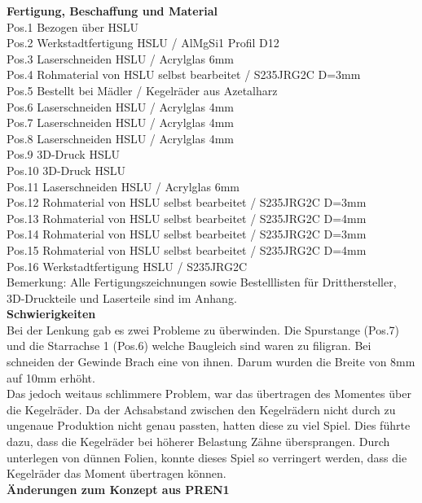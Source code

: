 \newpage
\textbf{Fertigung, Beschaffung und Material}\\[0.2cm]
Pos.1 	Bezogen über HSLU\\
Pos.2 	Werkstadtfertigung HSLU / AlMgSi1 Profil D12\\
Pos.3 	Laserschneiden HSLU / Acrylglas 6mm\\
Pos.4 	Rohmaterial von HSLU selbst bearbeitet / S235JRG2C D=3mm\\
Pos.5 	Bestellt bei Mädler / Kegelräder aus Azetalharz\\
Pos.6 	Laserschneiden HSLU / Acrylglas 4mm\\
Pos.7 	Laserschneiden HSLU / Acrylglas 4mm\\
Pos.8	Laserschneiden HSLU / Acrylglas 4mm\\
Pos.9 	3D-Druck HSLU\\
Pos.10	3D-Druck HSLU\\
Pos.11	Laserschneiden HSLU / Acrylglas 6mm\\
Pos.12	Rohmaterial von HSLU selbst bearbeitet / S235JRG2C D=3mm\\
Pos.13	Rohmaterial von HSLU selbst bearbeitet / S235JRG2C D=4mm\\
Pos.14	Rohmaterial von HSLU selbst bearbeitet / S235JRG2C D=3mm\\
Pos.15	Rohmaterial von HSLU selbst bearbeitet / S235JRG2C D=4mm\\
Pos.16	Werkstadtfertigung HSLU / S235JRG2C\\
Bemerkung: Alle Fertigungszeichnungen sowie Bestelllisten für Dritthersteller, 3D-Druckteile und Laserteile sind im Anhang.\\[0.2cm]
\textbf{Schwierigkeiten}\\[0.2cm]
Bei der Lenkung gab es zwei Probleme zu überwinden. Die Spurstange (Pos.7) und die Starrachse 1 (Pos.6) welche Baugleich sind waren zu filigran. Bei schneiden der Gewinde Brach eine von ihnen. Darum wurden die Breite von 8mm auf 10mm erhöht.\\
Das jedoch weitaus schlimmere Problem, war das übertragen des Momentes über die Kegelräder. Da der Achsabstand zwischen den Kegelrädern nicht durch zu ungenaue Produktion nicht genau passten, hatten diese zu viel Spiel. Dies führte dazu, dass die Kegelräder bei höherer Belastung Zähne übersprangen. Durch unterlegen von dünnen Folien, konnte dieses Spiel so verringert werden, dass die Kegelräder das Moment übertragen können.\\[0.2cm] 
\textbf{Änderungen zum Konzept aus PREN1}\\[0.2cm]
